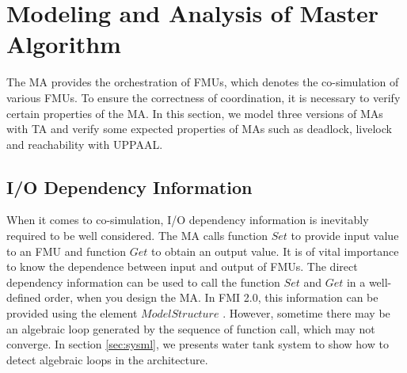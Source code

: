 \section{Modeling and Analysis of Master Algorithm}
\label{sec:ma}
The MA provides the orchestration of FMUs, which denotes the co-simulation of various FMUs. To ensure the correctness of coordination, it is necessary to verify certain properties of the MA. In this section, we model three versions of MAs with TA and verify some expected properties of MAs such as deadlock, livelock and reachability with UPPAAL.
\subsection{I/O Dependency Information}
When it comes to co-simulation, I/O dependency information \cite{BromanBGLMTW13} is inevitably required to be well considered. The MA calls function $Set$ to provide input value to an FMU and function $Get$ to obtain an output value. It is of vital importance to know the dependence between input and output of FMUs. The direct dependency information can be used to call the function $Set$ and $Get$ in a well-defined order, when you design the MA. In FMI 2.0, this information can be provided using the element $ModelStructure$ \cite{FMI2INTRO}. However, sometime there may be an algebraic loop generated by the sequence of function call, which may not converge. In section \ref{sec:sysml}, we presents water tank system to show how to detect algebraic loops in the architecture.
